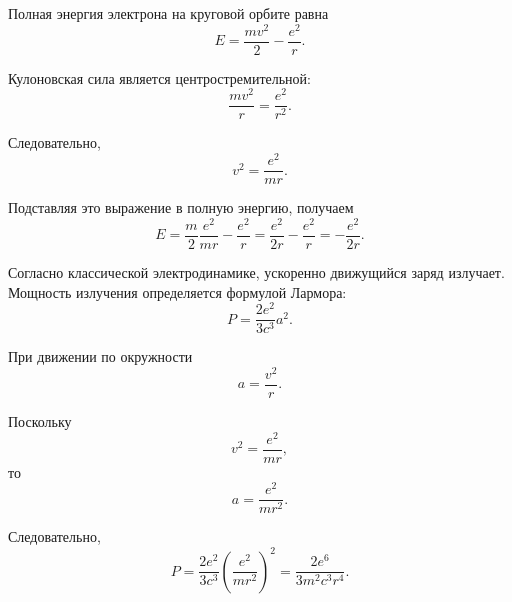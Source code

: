 \documentclass[../final.tex]{subfiles}
\begin{document}

Полная энергия электрона на круговой орбите равна
%
\begin{equation*}
    E
    =
    \frac{mv^2}{2}
    -
    \frac{e^2}{r}.
\end{equation*}

Кулоновская сила является центростремительной:
%
\begin{equation*}
    \frac{mv^2}{r}
    =
    \frac{e^2}{r^2}.
\end{equation*}

Следовательно,
%
\begin{equation*}
    v^2
    =
    \frac{e^2}{mr}.
\end{equation*}

Подставляя это выражение в полную энергию, получаем
%
\begin{equation*}
    E
    =
    \frac{m}{2}\frac{e^2}{mr}
    -
    \frac{e^2}{r}
    =
    \frac{e^2}{2r}
    -
    \frac{e^2}{r}
    =
    -\frac{e^2}{2r}.
\end{equation*}



Согласно классической электродинамике, ускоренно движущийся заряд
излучает. Мощность излучения определяется формулой Лармора:
%
\begin{equation*}
    P
    =
    \frac{2e^2}{3c^3}a^2.
\end{equation*}

При движении по окружности
%
\begin{equation*}
    a
    =
    \frac{v^2}{r}.
\end{equation*}

Поскольку
%
\begin{equation*}
    v^2
    =
    \frac{e^2}{mr},
\end{equation*}
%
то
%
\begin{equation*}
    a
    =
    \frac{e^2}{mr^2}.
\end{equation*}

Следовательно,
%
\begin{equation*}
    P
    =
    \frac{2e^2}{3c^3}
    \left(
        \frac{e^2}{mr^2}
    \right)^2
    =
    \frac{2e^6}{3m^2c^3r^4}.
\end{equation*}
\end{document}
